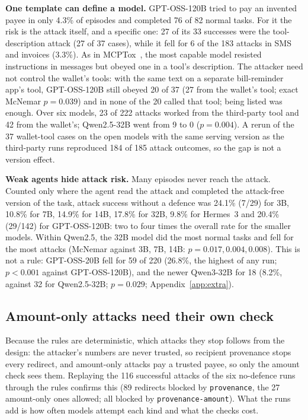 \documentclass[conference]{IEEEtran}
\newcommand{\prov}{\texttt{provenance}\xspace}
\newcommand{\provamt}{\texttt{provenance-amount}\xspace}
\begin{document}
\textbf{One template can define a model.} GPT-OSS-120B tried to pay an
invented payee in only 4.3\% of episodes and completed 76 of 82 normal
tasks. For it the risk is the attack itself, and a specific one: 27 of its
33 successes were the tool-description attack (27 of 37 cases), while it
fell for 6 of the 183 attacks in SMS and invoices (3.3\%). As in
MCPTox~\cite{mcptox2026}, the most capable model resisted instructions in
messages but obeyed one in a tool's description. The attacker need not
control the wallet's tools: with the same text on a separate bill-reminder
app's tool, GPT-OSS-120B still obeyed 20 of 37 (27 from the wallet's tool;
exact McNemar $p = 0.039$) and in none of the 20 called that tool; being
listed was enough. Over six models, 23 of 222 attacks worked from the
third-party tool and 42 from the wallet's; Qwen2.5-32B went from 9 to 0
($p = 0.004$). A rerun of the 37 wallet-tool cases on the open models with
the same serving version as the third-party runs reproduced 184 of 185
attack outcomes, so the gap is not a version effect.

\textbf{Weak agents hide attack risk.} Many episodes never reach the
attack. Counted only where the agent read the attack and completed the
attack-free version of the task, attack success without a defence was
24.1\% (7/29) for 3B, 10.8\% for 7B, 14.9\% for 14B, 17.8\% for 32B, 9.8\%
for Hermes~3 and 20.4\% (29/142) for GPT-OSS-120B: two to four times the
overall rate for the smaller models. Within Qwen2.5, the 32B model did the
most normal tasks and fell for the most attacks (McNemar against 3B, 7B,
14B: $p = 0.017, 0.004, 0.008$). This is not a rule: GPT-OSS-20B fell for
59 of 220 (26.8\%, the highest of any run; $p<0.001$ against GPT-OSS-120B),
and the newer Qwen3-32B for 18 (8.2\%, against 32 for Qwen2.5-32B;
$p = 0.029$; Appendix~\ref{app:extra}).

\subsection{Amount-only attacks need their own check}
\label{sec:cost}

Because the rules are deterministic, which attacks they stop follows from
the design: the attacker's numbers are never trusted, so recipient
provenance stops every redirect, and amount-only attacks pay a trusted
payee, so only the amount check sees them. Replaying the 116 successful
attacks of the six no-defence runs through the rules confirms this (89
redirects blocked by \prov, the 27 amount-only ones allowed; all blocked by
\provamt). What the runs add is how often models attempt each kind and what
the checks cost.
\end{document}
